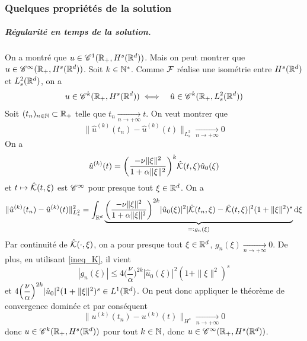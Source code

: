 \subsubsection{Quelques propriétés de la solution}
\subparagraph{Régularité en temps de la solution.} On a montré que $u \in \mathscr{C}^1(\mathbb{R}_+,H^s(\mathbb{R}^d))$. Mais on peut montrer que $u \in \mathscr{C}^{\infty}(\mathbb{R}_+,H^s(\mathbb{R}^d))$. Soit $k \in \mathbb{N}^*$. Comme $\mathcal{F}$ réalise une isométrie entre $H^s(\mathbb{R}^d)$ et $L^2_s(\mathbb{R}^d)$, on a 
\begin{eqnarray*}
    u \in \mathscr{C}^k(\mathbb{R}_+,H^s(\mathbb{R}^d)) &\iff& \hat{u} \in \mathscr{C}^k(\mathbb{R}_+,L^2_s(\mathbb{R}^d))
\end{eqnarray*}
Soit $(t_n)_{n \in \mathbb{N}} \subset \mathbb{R}_+$ telle que $t_n \underset{n \to +\infty}{\longrightarrow} t$. On veut montrer que 
\begin{equation*}
    \|\hat{u}^{(k)}(t_n)-\hat{u}^{(k)}(t)\|_{L^2_s} \underset{n \to +\infty}{\longrightarrow} 0
\end{equation*}
On a 
\begin{equation*}
    \hat{u}^{(k)}(t) = \bigg(\frac{-\nu\|\xi\|^2}{1+\alpha\|\xi\|^2}\bigg)^k \hat{\mathcal{K}}(t,\xi)\hat{u}_0(\xi)
\end{equation*}
et $t \mapsto \hat{\mathcal{K}}(t,\xi)$ est $\mathscr{C}^{\infty}$ pour presque tout $\xi \in \mathbb{R}^d$. On a 
\begin{equation*}
    \|\hat{u}^{(k)}(t_n)-\hat{u}^{(k)}(t)\|_{L^2_s}^2 = \int_{\mathbb{R}^d}\underbrace{\bigg(\frac{-\nu\|\xi\|^2}{1+\alpha\|\xi\|^2}\bigg)^{2k}|\hat{u}_0(\xi)|^2|\hat{\mathcal{K}}(t_n,\xi)-\hat{\mathcal{K}}(t,\xi)|^2(1+\|\xi\|^2)^s}_{=:g_n(\xi)}\mathrm{d}\xi
\end{equation*}
Par continuité de $\hat{\mathcal{K}}(\cdot,\xi)$, on a pour presque tout $\xi \in \mathbb{R}^d$, $g_n(\xi) \underset{n \to +\infty}{\longrightarrow}0$. De plus, en utilisant \eqref{ineq_K}, il vient
\begin{equation*}
    |g_n(\xi)| \leq 4\Big(\frac{\nu}{\alpha}\Big)^{2k}|\hat{u}_0(\xi)|^2 (1+\|\xi\|^2)^s
\end{equation*}
et $4\Big(\dfrac{\nu}{\alpha}\Big)^{2k}|\hat{u}_0|^2 (1+\|\xi\|^2)^s \in L^1(\mathbb{R}^d)$. On peut donc appliquer le théorème de convergence dominée et par conséquent
\begin{equation*}
    \|u^{(k)}(t_n)-u^{(k)}(t)\|_{H^s} \underset{n \to +\infty}{\longrightarrow} 0
\end{equation*}
donc $u \in \mathscr{C}^k(\mathbb{R}_+,H^s(\mathbb{R}^d))$ pour tout $k \in \mathbb{N}$, donc $u \in \mathscr{C}^{\infty}(\mathbb{R}_+,H^s(\mathbb{R}^d))$.

